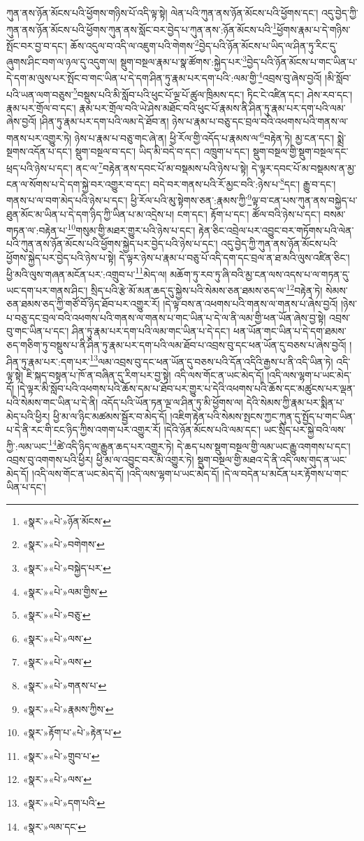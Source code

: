 ཀུན་ནས་ཉོན་མོངས་པའི་ཕྱོགས་གཉིས་པོ་འདི་ལྟ་སྟེ། ལེན་པའི་ཀུན་ནས་ཉོན་མོངས་པའི་ཕྱོགས་དང་། འདུ་བྱེད་ཀྱི་ཀུན་ནས་ཉོན་མོངས་པའི་ཕྱོགས་ཀུན་ནས་སློང་བར་བྱེད་པ་ཀུན་ནས་:ཉོན་མོངས་པའི་\footnote{«སྣར་»«པེ་»ཉོན་མོངས་}ཕྱོགས་རྣམ་པ་དེ་གཉིས་སྤོང་བར་བྱ་བ་དང་། ཆོས་འདུལ་བ་འདི་ལ་འཇུག་པའི་གེགས་\footnote{«སྣར་»«པེ་»བགེགས་}བྱེད་པའི་ཉོན་མོངས་པ་ཡིད་ལ་ཤིན་ཏུ་རིང་དུ་ཞུགས་ཤིང་བག་ལ་ཉལ་དུ་འདུག་ལ། སྡུག་བསྔལ་རྣམ་པ་སྣ་ཚོགས་:སྐྱེད་པར་\footnote{«སྣར་»«པེ་»བསྐྱེད་པར་}བྱེད་པའི་ཉོན་མོངས་པ་གང་ཡིན་པ་དེ་དག་མ་ལུས་པར་སྤོང་བ་གང་ཡིན་པ་དེ་དག་ཤིན་ཏུ་རྣམ་པར་དག་པའི་:ལམ་གྱི་\footnote{«སྣར་»«པེ་»ལམ་གྱིས་}འབྲས་བུ་ཞེས་བྱའོ། །མི་སློབ་པའི་ཡན་ལག་བཅུས་\footnote{«སྣར་»«པེ་»བཅུ་}བསྡུས་པའི་མི་སློབ་པའི་ཕུང་པོ་ལྔ་པོ་ཚུལ་ཁྲིམས་དང་། ཏིང་ངེ་འཛིན་དང་། ཤེས་རབ་དང་། རྣམ་པར་གྲོལ་བ་དང་། རྣམ་པར་གྲོལ་བའི་ཡེ་ཤེས་མཐོང་བའི་ཕུང་པོ་རྣམས་ནི་ཤིན་ཏུ་རྣམ་པར་དག་པའི་ལམ་ཞེས་བྱའོ། །ཤིན་ཏུ་རྣམ་པར་དག་པའི་ལམ་དེ་ཐོབ་ན། ཉེས་པ་རྣམ་པ་བཅུ་དང་བྲལ་བའི་འཕགས་པའི་གནས་ལ་གནས་པར་འགྱུར་ཏེ། ཉེས་པ་རྣམ་པ་བཅུ་གང་ཞེ་ན། ཕྱི་རོལ་གྱི་འདོད་པ་རྣམས་ལ་\footnote{«སྣར་»«པེ་»ལས་}བརྟེན་ཏེ། མྱ་ངན་དང་། སྨྲེ་སྔགས་འདོན་པ་དང་། སྡུག་བསྔལ་བ་དང་། ཡིད་མི་བདེ་བ་དང་། འཁྲུག་པ་དང་། སྡུག་བསྔལ་གྱི་སྡུག་བསྔལ་དང་ཕྲད་པའི་ཉེས་པ་དང་། ནང་ལ་\footnote{«སྣར་»«པེ་»ལས་}བརྟེན་ནས་དབང་པོ་མ་བསྡམས་པའི་ཉེས་པ་སྟེ། དེ་ལྟར་དབང་པོ་མ་བསྡམས་ན་མྱ་ངན་ལ་སོགས་པ་དེ་དག་སྐྱེ་བར་འགྱུར་བ་དང་། བདེ་བར་གནས་པའི་རོ་མྱང་བའི་:ཉེས་པ་\footnote{«སྣར་»«པེ་»གནས་པ་}དང་། རྒྱུ་བ་དང་། གནས་པ་ལ་བག་མེད་པའི་ཉེས་པ་དང་། ཕྱི་རོལ་པའི་མུ་སྟེགས་ཅན་:རྣམས་ཀྱི་\footnote{«སྣར་»«པེ་»རྣམས་ཀྱིས་}ལྟ་བ་ངན་པས་ཀུན་ནས་བསྐྱེད་པ་ཐུན་མོང་མ་ཡིན་པ་དེ་དག་ཉིད་ཀྱི་ཡིན་པ་མ་འདྲེས་པ། ངག་དང་། རྟོག་པ་དང་། ཚོལ་བའི་ཉེས་པ་དང་། བསམ་གཏན་ལ་:བརྟེན་པ་\footnote{«སྣར་»རྟོག་པ་«པེ་»རྟེན་པ་}གསུམ་གྱི་མཐར་གྱུར་པའི་ཉེས་པ་དང་། རྟེན་ཅིང་འབྲེལ་པར་འབྱུང་བར་གཏོགས་པའི་ལེན་པའི་ཀུན་ནས་ཉོན་མོངས་པའི་ཕྱོགས་སྐྱེད་པར་བྱེད་པའི་ཉེས་པ་དང་། འདུ་བྱེད་ཀྱི་ཀུན་ནས་ཉོན་མོངས་པའི་ཕྱོགས་སྐྱེད་པར་བྱེད་པའི་ཉེས་པ་སྟེ། དེ་ལྟར་ཉེས་པ་རྣམ་པ་བཅུ་པོ་འདི་དག་དང་བྲལ་ན་ཐ་མའི་ལུས་འཛིན་ཅིང་། ཕྱི་མའི་ལུས་གཞན་མངོན་པར་:འགྲུབ་པ་\footnote{«སྣར་»«པེ་»གྲུབ་པ་}མེད་ལ། མཆོག་ཏུ་རབ་ཏུ་ཞི་བའི་མྱ་ངན་ལས་འདས་པ་ལ་གཏན་དུ་ཡང་དག་པར་གནས་ཤིང་། སྲིད་པའི་རྩེ་མོ་མན་ཆད་དུ་སྐྱེས་པའི་སེམས་ཅན་ཐམས་ཅད་ལ་\footnote{«སྣར་»«པེ་»ལས་}བརྟེན་ཏེ། སེམས་ཅན་ཐམས་ཅད་ཀྱི་གཙོ་བོ་ཉིད་ཐོབ་པར་འགྱུར་རོ། །དེ་ལྟ་བས་ན་འཕགས་པའི་གནས་ལ་གནས་པ་ཞེས་བྱའོ། །ཉེས་པ་བཅུ་དང་བྲལ་བའི་འཕགས་པའི་གནས་ལ་གནས་པ་གང་ཡིན་པ་དེ་ལ་ནི་ལམ་གྱི་ཕན་ཡོན་ཞེས་བྱ་སྟེ། འབྲས་བུ་གང་ཡིན་པ་དང་། ཤིན་ཏུ་རྣམ་པར་དག་པའི་ལམ་གང་ཡིན་པ་དེ་དང་། ཕན་ཡོན་གང་ཡིན་པ་དེ་དག་ཐམས་ཅད་གཅིག་ཏུ་བསྡུས་པ་ནི་ཤིན་ཏུ་རྣམ་པར་དག་པའི་ལམ་ཐོབ་པ་འབྲས་བུ་དང་ཕན་ཡོན་དུ་བཅས་པ་ཞེས་བྱའོ། །ཤིན་ཏུ་རྣམ་པར་:དག་པར་\footnote{«སྣར་»«པེ་»དག་པའི་}ལམ་འབྲས་བུ་དང་ཕན་ཡོན་དུ་བཅས་པའི་དོན་འདིའི་རྒྱས་པ་ནི་འདི་ཡིན་ཏེ། འདི་ལྟ་སྟེ། ཇི་སྐད་བསྟན་པ་ཁོ་ན་བཞིན་དུ་རིག་པར་བྱ་སྟེ། འདི་ལས་གོང་ན་ཡང་མེད་དོ། །འདི་ལས་ལྷག་པ་ཡང་མེད་དོ། །དེ་ལྟར་མི་སློབ་པའི་འཕགས་པའི་ཆོས་དམ་པ་ཐོབ་པར་གྱུར་པ་དེའི་འཕགས་པའི་ཆོས་དང་མཚུངས་པར་ལྡན་པའི་སེམས་གང་ཡིན་པ་དེ་ནི། འདོད་པའི་ཡོན་ཏན་ལྔ་ལ་ཤིན་ཏུ་མི་ཕྱོགས་ལ། དེའི་སེམས་ཀྱི་རྣམ་པར་སྨིན་པ་མེད་པའི་ཕྱིར། ཕྱི་མ་ལ་ཉིང་མཚམས་སྦྱོར་བ་མེད་དོ། །འཇིག་རྟེན་པའི་སེམས་སྤངས་ཀྱང་ཀུན་དུ་སྤྱོད་པ་གང་ཡིན་པ་དེ་ནི་རང་གི་ངང་ཉིད་ཀྱིས་འགག་པར་འགྱུར་རོ། །དེའི་ཉོན་མོངས་པའི་ལམ་དང་། ཡང་སྲིད་པར་སྐྱེ་བའི་ལས་ཀྱི་:ལམ་ཡང་\footnote{«སྣར་»ལམ་དང་}ཚེ་འདི་ཉིད་ལ་རྒྱུན་ཆད་པར་འགྱུར་ཏེ། དེ་ཆད་པས་སྡུག་བསྔལ་གྱི་ལམ་ཡང་རྒྱུ་འགགས་པ་དང་། འབྲས་བུ་འགགས་པའི་ཕྱིར། ཕྱི་མ་ལ་འབྱུང་བར་མི་འགྱུར་ཏེ། སྡུག་བསྔལ་གྱི་མཐའ་དེ་ནི་འདི་ལས་གུད་ན་ཡང་མེད་དོ། །འདི་ལས་གོང་ན་ཡང་མེད་དོ། །འདི་ལས་ལྷག་པ་ཡང་མེད་དོ། །དེ་ལ་བདེན་པ་མངོན་པར་རྟོགས་པ་གང་ཡིན་པ་དང་། 